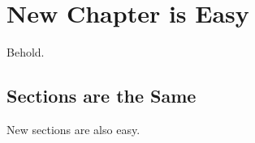 \chapter{New Chapter is Easy}
\label{chap2}

Behold. 


\section{Sections are the Same}
\label{section2}
New sections are also easy.
	 
